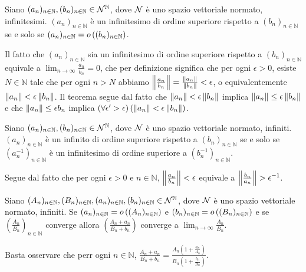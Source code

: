 \begin{Theorem}
	Siano $(a_n)_{n \in \mathbb{N}}, (b_n)_{n \in \mathbb{N}} \in \mathcal{N}^\mathbb{N}$, dove $\mathcal{N}$ \`e uno spazio vettoriale normato, infinitesimi. $(a_n)_{n \in \mathbb{N}}$ \`e un infinitesimo di ordine superiore rispetto a $(b_n)_{n \in \mathbb{N}}$ se e solo se $(a_n)_{n \in \mathbb{N}} = o \left ( (b_n)_{n \in \mathbb{N}} \right )$.
\end{Theorem}
\Proof Il fatto che $(a_n)_{n \in \mathbb{N}}$ sia un infinitesimo di ordine superiore rispetto a $(b_n)_{n \in \mathbb{N}}$ equivale a $\lim_{n \rightarrow \infty} \frac{a_n}{b_n} = 0$, che per definizione significa che per ogni $\epsilon > 0$, esiste $N \in \mathbb{N}$ tale che per ogni $n > N$ abbiamo $\Norm{\frac{a_n}{b_n}} = \frac{\Norm{a_n}}{\Norm{b_n}} < \epsilon$, o equivalentemente $\Norm{a_n} < \epsilon \Norm{b_n}$.  Il teorema segue dal fatto che $\Norm{a_n} < \epsilon \Norm{b_n}$ implica $\Norm{a_n} \leq \epsilon \Norm{b_n}$ e che $\Norm{a_n} \leq \epsilon{b_n}$ implica $\ForAll{\epsilon' > \epsilon}{\Norm{a_n} < \epsilon \Norm{b_n}}$. \EndProof
\begin{Theorem}
	Siano $(a_n)_{n \in \mathbb{N}}, (b_n)_{n \in \mathbb{N}} \in \mathcal{N}^\mathbb{N}$, dove $\mathcal{N}$ \`e uno spazio vettoriale normato, infiniti. $(a_n)_{n \in \mathbb{N}}$ \`e un infinito di ordine superiore rispetto a $(b_n)_{n \in \mathbb{N}}$ se e solo se $(a_n^{-1})_{n \in \mathbb{N}}$ \`e un infinitesimo di ordine superiore a $(b_n^{-1})_{n \in \mathbb{N}}$.
\end{Theorem}
\Proof Segue dal fatto che per ogni $\epsilon > 0$ e $n \in \mathbb{N}$, $\Norm{\frac{a_n}{b_n}} < \epsilon$ equivale a $\Norm{\frac{b_n}{a_n}} > \epsilon^{-1}$. \EndProof
\begin{Theorem}
	 Siano $(A_n)_{n \in \mathbb{N}}, (B_n)_{n \in \mathbb{N}}, (a_n)_{n \in \mathbb{N}}, (b_n)_{n \in \mathbb{N}} \in \mathcal{N}^\mathbb{N}$, dove $\mathcal{N}$ \`e uno spazio vettoriale normato, infiniti. Se $(a_n)_{n \in \mathbb{N}} = o \left ( (A_n)_{n \in \mathbb{N}} \right )$ e $(b_n)_{n \in \mathbb{N}} = o \left ( (B_n)_{n \in \mathbb{N}} \right )$ e se $\left ( \frac{A_n}{B_n} \right )_{n \in \mathbb{N}}$ converge allora $\left ( \frac{A_n + a_n}{B_n + b_n} \right )$ converge a $\lim_{n \rightarrow \infty} \frac{A_n}{B_n}$.
\end{Theorem}
\Proof Basta osservare che perr ogni $n \in \mathbb{N}$, $\frac{A_n + a_n}{B_n + b_n} = \frac{A_n \left ( 1 + \frac{a_n}{A_n} \right )}{B_n \left ( 1 + \frac{b_n}{B_n} \right )}$. \EndProof
